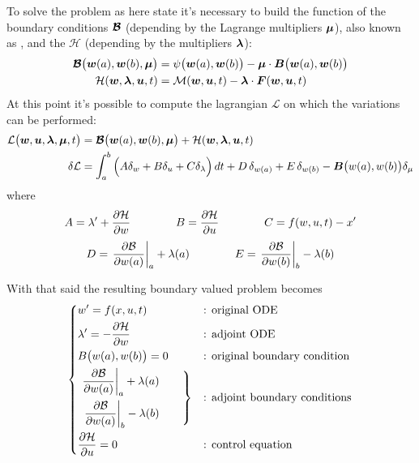 To solve the problem as here state it's necessary to build the function of the boundary conditions $\boldsymbol{\mathcal B}$ (depending by the Lagrange multipliers $\boldsymbol{\mu}$), also known as , and the  $\mathcal H$ (depending by the multipliers $\boldsymbol{\lambda}$):
\begin{equation}
	\begin{split}
		\boldsymbol{\mathcal B}\big(\boldsymbol{w}(a),\boldsymbol{w}(b),\boldsymbol{\mu}\big) & = \psi\big(\boldsymbol{w}(a),\boldsymbol{w}(b)\big) - \boldsymbol{\mu}\cdot \boldsymbol{B}\big( \boldsymbol{w}(a),\boldsymbol{w}(b) \big) \\
		\mathcal H(\boldsymbol{w},\boldsymbol{\lambda},\boldsymbol{u},t) & = \mathcal M(\boldsymbol{w}, \boldsymbol{u},t) - \boldsymbol{\lambda} \cdot \boldsymbol{F}(\boldsymbol{w},\boldsymbol{u}, t)
	\end{split}
\end{equation}
At this point it's possible to compute the lagrangian $\mathcal L $ on which the variations can be performed:
\begin{equation}
	\begin{split}
		\mathcal L \big( \boldsymbol{w},\boldsymbol{u},\boldsymbol{\lambda}, \boldsymbol{\mu} ,t \big) & = \boldsymbol{\mathcal B}\big(\boldsymbol{w}(a),\boldsymbol{w}(b),\boldsymbol{\mu}\big) + \mathcal H(\boldsymbol{w},\boldsymbol{\lambda},\boldsymbol{u},t) \\
		\delta \mathcal L  & = \int_a^b \Big( A \delta_w + B \delta_u + C \delta_\lambda \Big)\, dt + D \, \delta_{w(a)} + E \, \delta_{w(b)} - \boldsymbol{B} \big(w(a),w(b)\big) \delta_\mu
	\end{split}
\end{equation}
where
\[ A = \lambda' + \frac{\partial \mathcal H}{\partial w} \qquad \qquad B = \frac{\partial \mathcal H}{\partial u} \qquad \qquad C = f(w,u,t) - x' \] \[  D = \left.\frac{\partial \mathcal B}{\partial w(a)}\right|_{a}+ \lambda(a) \qquad \qquad E = \left.\frac{\partial \mathcal B}{\partial w(b)}\right|_{b} -\lambda(b) \]

With that said the resulting boundary valued problem becomes
\begin{equation} \label{eq:opt:generalsolution}
	\left\{ \begin{aligned}
		&w' = f(x,u,t) && \textrm{: original ODE} \\
		&\lambda' = - \frac{\partial \mathcal H}{\partial w} && \textrm{: adjoint ODE} \\
		&B\big(w(a),w(b)\big) = 0 && \textrm{: original boundary condition} \\
		&\left. \begin{aligned}
			\left.\frac{\partial \mathcal B}{\partial w(a)}\right|_{a}+ \lambda(a) \\
			\left.\frac{\partial \mathcal B}{\partial w(a)}\right|_{b} - \lambda(b)
		\end{aligned} \qquad \right\} &&\textrm{: adjoint boundary conditions} \\
		& \frac{\partial \mathcal H}{\partial u} = 0 && \textrm{: control equation}
	\end{aligned} \right. 
\end{equation}


